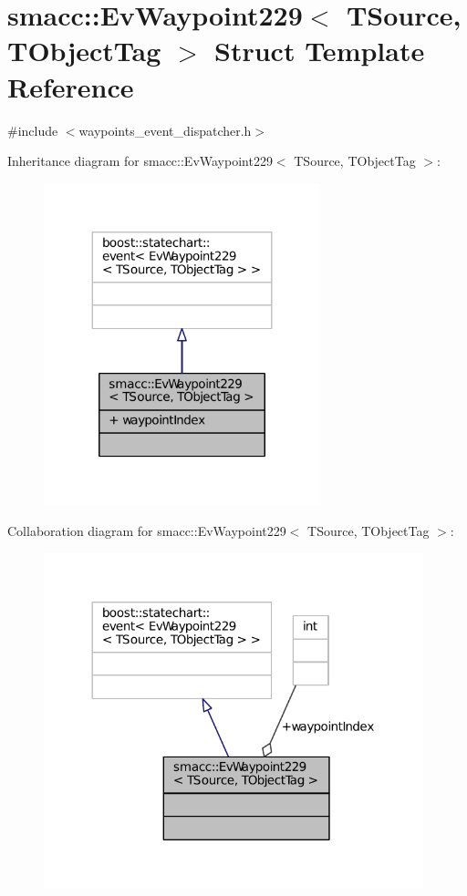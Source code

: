 \hypertarget{structsmacc_1_1EvWaypoint229}{}\section{smacc\+:\+:Ev\+Waypoint229$<$ T\+Source, T\+Object\+Tag $>$ Struct Template Reference}
\label{structsmacc_1_1EvWaypoint229}


{\ttfamily \#include $<$waypoints\+\_\+event\+\_\+dispatcher.\+h$>$}



Inheritance diagram for smacc\+:\+:Ev\+Waypoint229$<$ T\+Source, T\+Object\+Tag $>$\+:
\nopagebreak
\begin{figure}[H]
\begin{center}
\leavevmode
\includegraphics[width=227pt]{structsmacc_1_1EvWaypoint229__inherit__graph}
\end{center}
\end{figure}


Collaboration diagram for smacc\+:\+:Ev\+Waypoint229$<$ T\+Source, T\+Object\+Tag $>$\+:
\nopagebreak
\begin{figure}[H]
\begin{center}
\leavevmode
\includegraphics[width=312pt]{structsmacc_1_1EvWaypoint229__coll__graph}
\end{center}
\end{figure}
